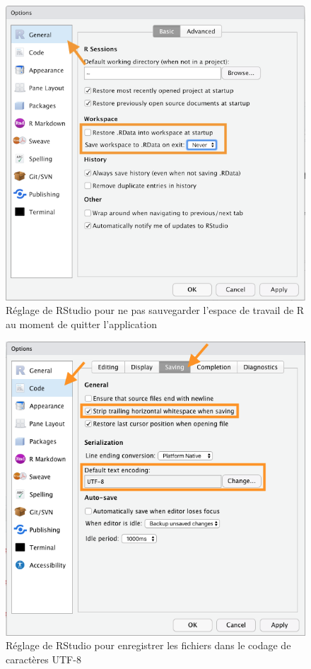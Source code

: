 \begin{figure}
  \centering
  \includegraphics{images/rstudio-startup-and-exit}
  \caption{Réglage de RStudio pour ne pas sauvegarder l'espace
    de travail de R au moment de quitter l'application}
  \label{fig:rstudio:rstudio-startup-and-exit}
\end{figure}

\begin{figure}
  \centering
  \includegraphics{images/rstudio-utf-8+whitespace}
  \caption{Réglage de RStudio pour enregistrer les fichiers dans
    le codage de caractères UTF-8}
  \label{fig:rstudio:rstudio-utf-8}
\end{figure}


